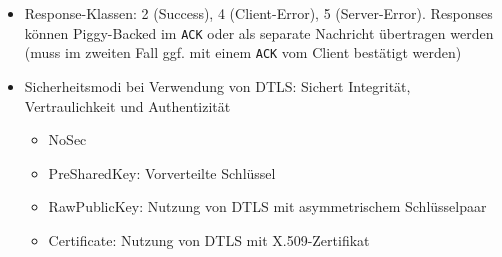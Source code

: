 \begin{itemize}
\begin{itemize}
		\item Response-Klassen: 2 (Success), 4 (Client-Error), 5 (Server-Error). Responses können Piggy-Backed im \texttt{ACK} oder als separate Nachricht übertragen werden (muss im zweiten Fall ggf. mit einem \texttt{ACK} vom Client bestätigt werden)
		\item Sicherheitsmodi bei Verwendung von DTLS: Sichert Integrität, Vertraulichkeit und Authentizität
		\begin{itemize}
			\item NoSec
			\item PreSharedKey: Vorverteilte Schlüssel
			\item RawPublicKey: Nutzung von DTLS mit asymmetrischem Schlüsselpaar
			\item Certificate: Nutzung von DTLS mit X.509-Zertifikat
		\end{itemize}
	\end{itemize}
\end{itemize}

